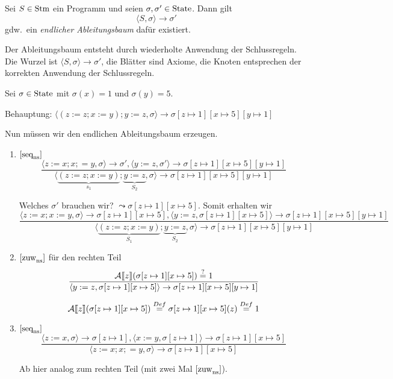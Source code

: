 \begin{definition}
    Sei $S \in \operatorname{Stm}$ ein Programm und seien $\sigma, \sigma' \in \operatorname{State}$. Dann gilt
    \[
    \langle S, \sigma \rangle \to \sigma'
    \]
    gdw.\ ein \emph{endlicher Ableitungsbaum} dafür existiert.

    Der Ableitungsbaum entsteht durch wiederholte Anwendung der Schlussregeln. Die Wurzel ist $\langle S, \sigma \rangle \to \sigma'$, die Blätter sind Axiome, die Knoten entsprechen der korrekten Anwendung der Schlussregeln.
\end{definition}

\begin{example}
    Sei $\sigma \in \operatorname{State}$ mit $\sigma(x) = 1$ und $\sigma(y) = 5$.

    Behauptung: $\langle (z := z; x := y); y := z, \sigma \rangle \to \sigma[z \mapsto 1][x \mapsto 5][y \mapsto 1]$

    Nun müssen wir den endlichen Ableitungsbaum erzeugen.


    \begin{enumerate}
        \item $[\text{seq}_{\text{ns}}^{}]$
            \[
            \frac{\langle z := x; x ;= y, \sigma \rangle \to \sigma', \langle y := z, \sigma' \rangle \to \sigma[z \mapsto 1][x \mapsto 5][y \mapsto 1]}{\langle \underbrace{(z := z; x := y)}_{s_1}; \underbrace{y := z}_{S_2}, \sigma \rangle \to \sigma[z \mapsto 1][x \mapsto 5][y \mapsto 1]}
            \]

            Welches $\sigma'$ brauchen wir? $\leadsto \sigma[z \mapsto 1][x \mapsto 5]$. Somit erhalten wir
            \[
            \frac{\langle z := x; x := y, \sigma \rangle \to \sigma[z \mapsto 1][x \mapsto 5], \langle y := z, \sigma[z \mapsto 1][x \mapsto 5] \rangle \to \sigma[z \mapsto 1][x \mapsto 5][y \mapsto 1]}{\langle \underbrace{(z := z; x := y)}_{S_1}; \underbrace{y := z}_{S_2}, \sigma \rangle \to \sigma[z \mapsto 1][x \mapsto 5][y \mapsto 1]}
            \]

        \item $[\text{zuw}_{\text{ns}}^{}]$ für den rechten Teil
            \[
            \frac{\mathcal{A}\mathrm{[}\kern-.14em\mathrm{[} z\mathrm{]}\kern-.14em\mathrm{]}(\sigma[z \mapsto 1][x \mapsto 5]) \overset{?}{=} 1}{\langle y := z, \sigma[z \mapsto 1][x \mapsto 5] \rangle \to \sigma[z \mapsto 1][x \mapsto 5][y \mapsto 1]}
            \]

            \[
            \mathcal{A}\mathrm{[}\kern-.14em\mathrm{[} z\mathrm{]}\kern-.14em\mathrm{]}(\sigma[z \mapsto 1][x \mapsto 5]) \overset{Def}{=} \sigma[z \mapsto 1][x \mapsto 5](z) \overset{Def}{=} 1
            \]

        \item $[\text{seq}_{\text{ns}}^{}]$
            \[
            \frac{\langle z := x, \sigma \rangle \to \sigma[z \mapsto 1], \langle x := y, \sigma[z \mapsto 1] \rangle \to \sigma[z \mapsto 1][x \mapsto 5]}{\langle z := x; x ;= y, \sigma \rangle \to \sigma[z \mapsto 1][x \mapsto 5]}
            \]

            Ab hier analog zum rechten Teil (mit zwei Mal $[\text{zuw}_{\text{ns}}^{}]$).
    \end{enumerate}
\end{example}

